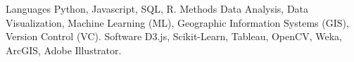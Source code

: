 \begin{cvskills}
  \cvskill
    {Languages}
    {Python, Javascript, SQL, R.}
\cvskill
    {Methods}
    {Data Analysis, Data Visualization, Machine Learning (ML), Geographic Information Systems (GIS), Version Control (VC).}
\cvskill
    {Software}
    {D3.js, Scikit-Learn, Tableau, OpenCV, Weka, ArcGIS, Adobe Illustrator.}
\end{cvskills}
